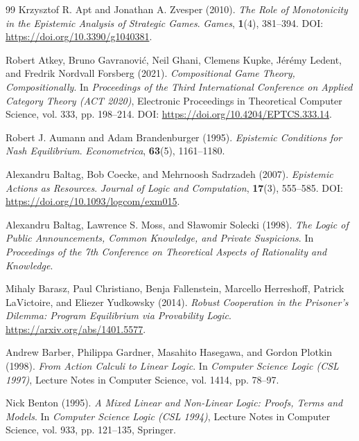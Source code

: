 \documentclass[11pt,a4paper]{article}
\numberwithin{equation}{section}
\theoremstyle{definition}
\theoremstyle{remark}
\theoremstyle{plain}
\begin{document}
\begin{thebibliography}{99}
Krzysztof R. Apt and Jonathan A. Zvesper (2010).
\newblock \emph{The Role of Monotonicity in the Epistemic Analysis of Strategic Games}.
\newblock \emph{Games}, \textbf{1}(4), 381--394.
\newblock DOI: \url{https://doi.org/10.3390/g1040381}.

Robert Atkey, Bruno Gavranović, Neil Ghani, Clemens Kupke, Jérémy Ledent, and Fredrik Nordvall Forsberg (2021).
\newblock \emph{Compositional Game Theory, Compositionally}.
\newblock In \emph{Proceedings of the Third International Conference on Applied Category Theory (ACT 2020)}, Electronic Proceedings in Theoretical Computer Science, vol. 333, pp. 198--214.
\newblock DOI: \url{https://doi.org/10.4204/EPTCS.333.14}.

Robert J. Aumann and Adam Brandenburger (1995).
\newblock \emph{Epistemic Conditions for Nash Equilibrium}.
\newblock \emph{Econometrica}, \textbf{63}(5), 1161--1180.

Alexandru Baltag, Bob Coecke, and Mehrnoosh Sadrzadeh (2007).
\newblock \emph{Epistemic Actions as Resources}.
\newblock \emph{Journal of Logic and Computation}, \textbf{17}(3), 555--585.
\newblock DOI: \url{https://doi.org/10.1093/logcom/exm015}.

Alexandru Baltag, Lawrence S. Moss, and Sławomir Solecki (1998).
\newblock \emph{The Logic of Public Announcements, Common Knowledge, and Private Suspicions}.
\newblock In \emph{Proceedings of the 7th Conference on Theoretical Aspects of Rationality and Knowledge}.

Mihaly Barasz, Paul Christiano, Benja Fallenstein, Marcello Herreshoff, Patrick LaVictoire, and Eliezer Yudkowsky (2014).
\newblock \emph{Robust Cooperation in the Prisoner's Dilemma: Program Equilibrium via Provability Logic}.
\newblock \url{https://arxiv.org/abs/1401.5577}.

Andrew Barber, Philippa Gardner, Masahito Hasegawa, and Gordon Plotkin (1998).
\newblock \emph{From Action Calculi to Linear Logic}.
\newblock In \emph{Computer Science Logic (CSL 1997)}, Lecture Notes in Computer Science, vol. 1414, pp. 78--97.

Nick Benton (1995).
\newblock \emph{A Mixed Linear and Non-Linear Logic: Proofs, Terms and Models}.
\newblock In \emph{Computer Science Logic (CSL 1994)}, Lecture Notes in Computer Science, vol. 933, pp. 121--135, Springer.


\end{thebibliography}
\end{document}

